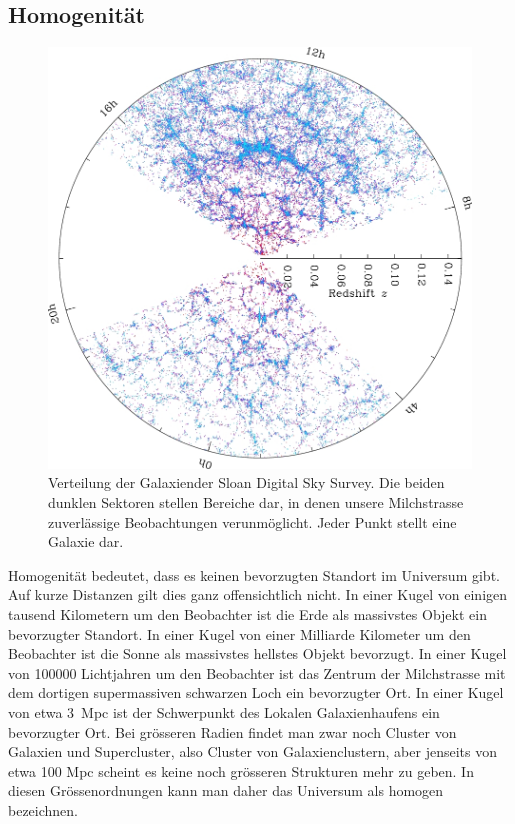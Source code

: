 \subsection{Homogenität}
\begin{figure}
\centering
\includegraphics[width=\hsize]{chapters/images/orangepie-negative.jpg}
\caption{Verteilung der Galaxiender Sloan Digital Sky Survey.
Die beiden dunklen Sektoren stellen Bereiche dar, in denen unsere
Milchstrasse zuverlässige Beobachtungen verunmöglicht.
Jeder Punkt stellt eine Galaxie dar.
\label{skript:robertson:orangepie}}
\end{figure}

Homogenität bedeutet, dass es keinen bevorzugten Standort im Universum gibt.
Auf kurze Distanzen gilt dies ganz offensichtlich nicht.
In einer Kugel von einigen tausend Kilometern um den Beobachter ist
die Erde als massivstes Objekt ein bevorzugter Standort.
In einer Kugel von einer Milliarde Kilometer um den Beobachter ist
die Sonne als massivstes hellstes Objekt bevorzugt.
In einer Kugel von 100000 Lichtjahren um den Beobachter ist das Zentrum
der Milchstrasse mit dem dortigen supermassiven schwarzen Loch ein
bevorzugter Ort.
In einer Kugel von etwa 3~Mpc ist der Schwerpunkt des Lokalen Galaxienhaufens
ein bevorzugter Ort.
Bei grösseren Radien findet man zwar noch Cluster von Galaxien und
Supercluster, also Cluster von Galaxienclustern, aber jenseits von
etwa 100 Mpc scheint es keine noch grösseren Strukturen mehr zu geben.
In diesen Grössenordnungen kann man daher das Universum als homogen
bezeichnen.

